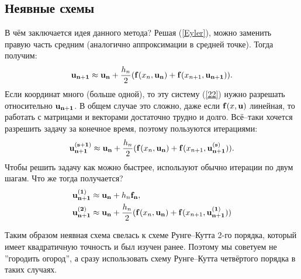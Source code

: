 \documentclass[a4paper,9pt,russian]{article}
\begin{document}
\subsection{Неявные схемы}
    В чём заключается идея данного метода? Решая (\ref{Eyler}), можно заменить правую часть средним (аналогично аппроксимации в средней точке). Тогда получим:
    \begin{equation}\label{22}
        {\bf u_{n+1}} \approx {\bf u_{n}} + \frac{h_n}{2} ({\bf f}(x_n, {\bf u_n}) + {\bf f}(x_{n+1}, {\bf u_{n+1}})).
    \end{equation}
    Если координат много (больше одной), то эту систему (\ref{22}) нужно  разрешать относительно ${\bf u_{n+1}}$. В общем случае это сложно, даже если ${\bf f}(x, {\bf u})$ линейная, то работать с матрицами и векторами достаточно трудно и долго. Всё--таки хочется разрешить задачу за конечное время, поэтому пользуются итерациями:
    \begin{equation}\label{interp}
     {\bf u_{n+1}^{(s+1)}} \approx {\bf u_{n}} + \frac{h_n}{2} ({\bf f}(x_n, {\bf u_n}) + {\bf f}(x_{n+1}, {\bf u_{n+1}^{(s)}})).
    \end{equation}
    Чтобы решить задачу как можно быстрее, используют обычно итерации по двум шагам. Что же тогда получается?
    \begin{equation}
    \begin{split}
     {\bf u_{n+1}^{(1)}} &\approx {\bf u_{n}} + h_n {\bf f_{n}},\\
     {\bf u_{n+1}^{(2)}} &\approx {\bf u_{n}} + \frac{h_n}{2} ({\bf f}(x_n, {\bf u_n}) + {\bf f}(x_{n+1}, {\bf u_{n+1}^{(1)}}))
    \end{split}
    \end{equation}\par
    {Таким образом неявная схема свелась к схеме Рунге--Кутта 2-го порядка, который имеет квадратичную точность и был изучен ранее.} Поэтому мы советуем не ''городить огород'', а сразу использовать схему Рунге--Кутта четвёртого порядка в таких случаях.
\end{document}
